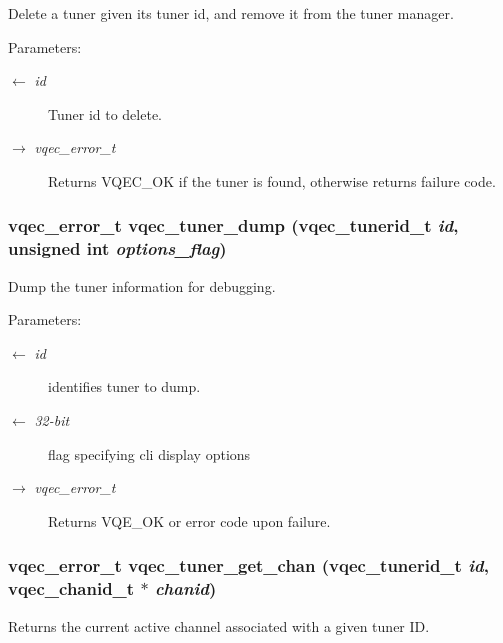 Delete a tuner given its tuner id, and remove it from the tuner manager.

\begin{Desc}
\item[Parameters:]
\begin{description}
\item[\mbox{$\leftarrow$} {\em id}]Tuner id to delete. \item[\mbox{$\rightarrow$} {\em vqec\_\-error\_\-t}]Returns VQEC\_\-OK if the tuner is found, otherwise returns failure code. \end{description}
\end{Desc}
\subsubsection{\setlength{\rightskip}{0pt plus 5cm}vqec\_\-error\_\-t vqec\_\-tuner\_\-dump (vqec\_\-tunerid\_\-t {\em id}, unsigned int {\em options\_\-flag})}\label{vqec__tuner_8h_00204a54177684b6cc97b76589710260}


Dump the tuner information for debugging. \begin{Desc}
\item[Parameters:]
\begin{description}
\item[\mbox{$\leftarrow$} {\em id}]identifies tuner to dump. \item[\mbox{$\leftarrow$} {\em 32-bit}]flag specifying cli display options \item[\mbox{$\rightarrow$} {\em vqec\_\-error\_\-t}]Returns VQE\_\-OK or error code upon failure. \end{description}
\end{Desc}
\subsubsection{\setlength{\rightskip}{0pt plus 5cm}vqec\_\-error\_\-t vqec\_\-tuner\_\-get\_\-chan (vqec\_\-tunerid\_\-t {\em id}, \bf{vqec\_\-chanid\_\-t} $\ast$ {\em chanid})}\label{vqec__tuner_8h_cb607c46e7fc451bd9ae7507f78c06e4}


Returns the current active channel associated with a given tuner ID.

